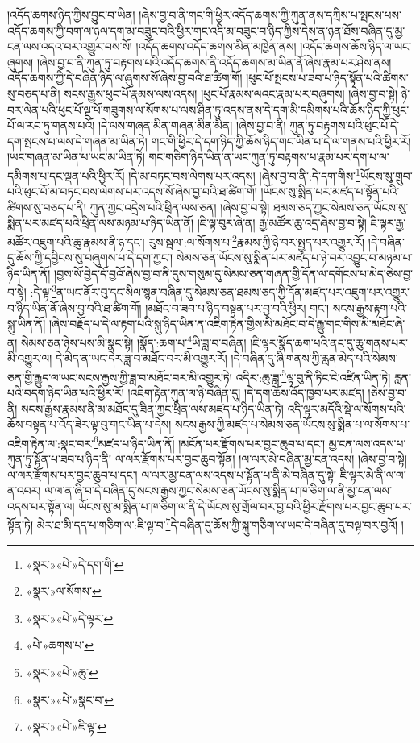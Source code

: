 །འདོད་ཆགས་ཉིད་ཀྱིས་བྱུང་བ་ཡིན། །ཞེས་བྱ་བ་ནི་གང་གི་ཕྱིར་འདོད་ཆགས་ཀྱི་ཀུན་ནས་དཀྲིས་པ་སྤངས་པས་འདོད་ཆགས་ཀྱི་བག་ལ་ཉལ་དག་མ་བཟུང་བའི་ཕྱིར་གང་འདི་མ་བཟུང་བ་ཉིད་ཀྱིས་དེས་ན་ཉན་ཐོས་བཞིན་དུ་མྱ་ངན་ལས་འདའ་བར་འགྱུར་བས་སོ། །འདོད་ཆགས་འདོད་ཆགས་མིན་མཁྱེན་ནས། །འདོད་ཆགས་ཆོས་ཉིད་ལ་ཡང་ཞུགས། །ཞེས་བྱ་བ་ནི་ཀུན་ཏུ་བརྟགས་པའི་འདོད་ཆགས་ནི་འདོད་ཆགས་མ་ཡིན་ནོ་ཞེས་རྣམ་པར་ཤེས་ནས། འདོད་ཆགས་ཀྱི་དེ་བཞིན་ཉིད་ལ་ཞུགས་སོ་ཞེས་བྱ་བའི་ཐ་ཚིག་གོ། །ཕུང་པོ་སྤངས་པ་ཟབ་པ་ཉིད་སྟོན་པའི་ཚིགས་སུ་བཅད་པ་ནི། སངས་རྒྱས་ཕུང་པོ་རྣམས་ལས་འདས། །ཕུང་པོ་རྣམས་ལའང་རྣམ་པར་བཞུགས། །ཞེས་བྱ་བ་སྟེ། ཉེ་བར་ལེན་པའི་ཕུང་པོ་ལྔ་པོ་གཟུགས་ལ་སོགས་པ་ལས་ཤིན་ཏུ་འདས་ནས་དེ་དག་མི་དམིགས་པའི་ཆོས་ཉིད་ཀྱི་ཕུང་པོ་ལ་རབ་ཏུ་གནས་པའོ། །དེ་ལས་གཞན་མིན་གཞན་མིན་མིན། །ཞེས་བྱ་བ་ནི། ཀུན་ཏུ་བརྟགས་པའི་ཕུང་པོ་དེ་དག་སྤངས་པ་ལས་དེ་གཞན་མ་ཡིན་ཏེ། གང་གི་ཕྱིར་དེ་དག་ཉིད་ཀྱི་ཆོས་ཉིད་གང་ཡིན་པ་དེ་ལ་གནས་པའི་ཕྱིར་རོ། །ཡང་གཞན་མ་ཡིན་པ་ཡང་མ་ཡིན་ཏེ། གང་གཅིག་ཉིད་ཡིན་ན་ཡང་ཀུན་ཏུ་བརྟགས་པ་རྣམ་པར་དག་པ་ལ་དམིགས་པ་དང་ལྡན་པའི་ཕྱིར་རོ། །དེ་མ་བཏང་བས་ལེགས་པར་འདས། །ཞེས་བྱ་བ་ནི་:དེ་དག་གིས་\footnote{«སྣར་»«པེ་»དེ་དག་གི་}ཡོངས་སུ་གྲུབ་པའི་ཕུང་པོ་མ་བཏང་བས་ལེགས་པར་འདས་སོ་ཞེས་བྱ་བའི་ཐ་ཚིག་གོ། །ཡོངས་སུ་སྨིན་པར་མཛད་པ་སྟོན་པའི་ཚིགས་སུ་བཅད་པ་ནི། ཀུན་ཀྱང་འདྲེས་པའི་ཕྲིན་ལས་ཅན། །ཞེས་བྱ་བ་སྟེ། ཐམས་ཅད་ཀྱང་སེམས་ཅན་ཡོངས་སུ་སྨིན་པར་མཛད་པའི་ཕྲིན་ལས་མཉམ་པ་ཉིད་ཡིན་ནོ། །ཇི་ལྟ་བུར་ཞེ་ན། རྒྱ་མཚོར་ཆུ་འདྲ་ཞེས་བྱ་བ་སྟེ། ཇི་ལྟར་རྒྱ་མཚོར་འཇུག་པའི་ཆུ་རྣམས་ནི་ཉ་དང་། རུས་སྦལ་:ལ་སོགས་པ་\footnote{«སྣར་»ལ་སོགས་}རྣམས་ཀྱི་ཉེ་བར་སྤྱད་པར་འགྱུར་རོ། །དེ་བཞིན་དུ་ཆོས་ཀྱི་དབྱིངས་སུ་བཞུགས་པ་དེ་དག་ཀྱང་། སེམས་ཅན་ཡོངས་སུ་སྨིན་པར་མཛད་པ་ཉེ་བར་འབྱུང་བ་མཉམ་པ་ཉིད་ཡིན་ནོ། །བྱས་སོ་བྱེད་དོ་བྱའོ་ཞེས་བྱ་བ་ནི་དུས་གསུམ་དུ་སེམས་ཅན་གཞན་གྱི་དོན་ལ་དགོངས་པ་མེད་ཅེས་བྱ་བ་སྟེ། :དེ་ལྟ་\footnote{«སྣར་»«པེ་»དེ་ལྟར་}ན་ཡང་ནོར་བུ་དང་སིལ་སྙན་བཞིན་དུ་སེམས་ཅན་ཐམས་ཅད་ཀྱི་དོན་མཛད་པར་འཇུག་པར་འགྱུར་བ་ཉིད་ཡིན་ནོ་ཞེས་བྱ་བའི་ཐ་ཚིག་གོ། །མཐོང་བ་ཟབ་པ་ཉིད་བསྟན་པར་བྱ་བའི་ཕྱིར། གང་། སངས་རྒྱས་རྟག་པའི་སྐུ་ཡིན་ནོ། །ཞེས་བརྗོད་པ་དེ་ལ་རྟག་པའི་སྐུ་ཉིད་ཡིན་ན་འཇིག་རྟེན་གྱིས་མི་མཐོང་བ་དེ་རྒྱུ་གང་གིས་མི་མཐོང་ཞེ་ན། སེམས་ཅན་ཉེས་པས་མི་སྣང་སྟེ། །སྣོད་:ཆག་པ་\footnote{«པེ་»ཆགས་པ་}ཡི་ཟླ་བ་བཞིན། །ཇི་ལྟར་སྣོད་ཆག་པའི་ནང་དུ་ཆུ་གནས་པར་མི་འགྱུར་ལ། དེ་མེད་ན་ཡང་དེར་ཟླ་བ་མཐོང་བར་མི་འགྱུར་རོ། །དེ་བཞིན་དུ་ཞི་གནས་ཀྱི་རླན་མེད་པའི་སེམས་ཅན་གྱི་རྒྱུད་ལ་ཡང་སངས་རྒྱས་ཀྱི་ཟླ་བ་མཐོང་བར་མི་འགྱུར་ཏེ། འདིར་:ཆུ་ཟླ་\footnote{«སྣར་»«པེ་»ཆུ་}ལྟ་བུ་ནི་ཏིང་ངེ་འཛིན་ཡིན་ཏེ། རླན་པའི་བདག་ཉིད་ཡིན་པའི་ཕྱིར་རོ། །འཇིག་རྟེན་ཀུན་ལ་ཉི་བཞིན་དུ། །དེ་དག་ཆོས་འོད་ཁྱབ་པར་མཛད། །ཅེས་བྱ་བ་ནི། སངས་རྒྱས་རྣམས་ནི་མ་མཐོང་དུ་ཟིན་ཀྱང་ཕྲིན་ལས་མཛད་པ་ཉིད་ཡིན་ཏེ། འདི་ལྟར་མདོའི་སྡེ་ལ་སོགས་པའི་ཆོས་བསྟན་པ་འོད་ཟེར་ལྟ་བུ་གང་ཡིན་པ་དེས། སངས་རྒྱས་ཀྱི་མཛད་པ་སེམས་ཅན་ཡོངས་སུ་སྨིན་པ་ལ་སོགས་པ་འཇིག་རྟེན་ལ་:སྣང་བར་\footnote{«སྣར་»«པེ་»སྣང་བ་}མཛད་པ་ཉིད་ཡིན་ནོ། །མངོན་པར་རྫོགས་པར་བྱང་ཆུབ་པ་དང་། མྱ་ངན་ལས་འདས་པ་ཀུན་ཏུ་སྟོན་པ་ཟབ་པ་ཉིད་ནི། ལ་ལར་རྫོགས་པར་བྱང་ཆུབ་སྟོན། །ལ་ལར་མེ་བཞིན་མྱ་ངན་འདས། །ཞེས་བྱ་བ་སྟེ། ལ་ལར་རྫོགས་པར་བྱང་ཆུབ་པ་དང་། ལ་ལར་མྱ་ངན་ལས་འདས་པ་སྟོན་པ་ནི་མེ་བཞིན་དུ་སྟེ། ཇི་ལྟར་མེ་ནི་ལ་ལ་ན་འབར། ལ་ལ་ན་ཞི་བ་དེ་བཞིན་དུ་སངས་རྒྱས་ཀྱང་སེམས་ཅན་ཡོངས་སུ་སྨིན་པ་ཁ་ཅིག་ལ་ནི་མྱ་ངན་ལས་འདས་པར་སྟོན་ལ། ཡོངས་སུ་མ་སྨིན་པ་ཁ་ཅིག་ལ་ནི་དེ་ཡོངས་སུ་གྲོལ་བར་བྱ་བའི་ཕྱིར་རྫོགས་པར་བྱང་ཆུབ་པར་སྟོན་ཏེ། མེར་ཐ་མི་དད་པ་གཅིག་ལ་:ཇི་ལྟ་བ་\footnote{«སྣར་»«པེ་»ཇི་ལྟ་}དེ་བཞིན་དུ་ཆོས་ཀྱི་སྐུ་གཅིག་ལ་ཡང་དེ་བཞིན་དུ་བལྟ་བར་བྱའོ། །
